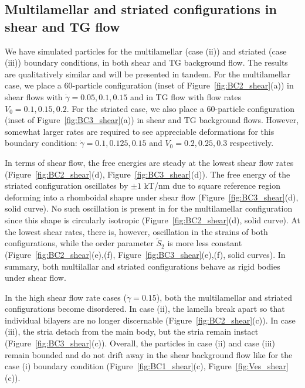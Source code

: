 \documentclass[aps,prl,preprint,groupedaddress]{revtex4-2}
\begin{document}
\subsection{Multilamellar and striated configurations in shear and TG flow}
We have simulated particles for the multilamellar (case (ii)) and striated (case (iii))
boundary conditions, in both shear and TG background flow.  The results are
qualitatively similar and will be presented in tandem. 
For the multilamellar case, we place a 60-particle configuration (inset of Figure~\ref{fig:BC2_shear}(a))
in shear flows with $\dot\gamma=0.05, 0.1, 0.15$ and in TG flow with flow rates $V_0=0.1, 0.15, 0.2$.
For the striated case, we also place a 60-particle configuration (inset of Figure~\ref{fig:BC3_shear}(a))
in shear and TG background flows.  However, somewhat larger rates are required to see appreciable
deformations for this boundary condition: $\dot\gamma=0.1, 0.125, 0.15$
and $V_0=0.2, 0.25, 0.3$ respectively.  

In terms of shear flow, the free energies are steady at the lowest shear flow
rates (Figure~\ref{fig:BC2_shear}(d), Figure~\ref{fig:BC3_shear}(d)).
The free energy of the striated configuration oscillates by $\pm 1$ kT/nm
due to square reference region deforming into a rhomboidal shapre under shear
flow (Figure~\ref{fig:BC3_shear}(d), solid curve).  No such oscillation
is present in for the multilamellar configuration since this shape is circularly
isotropic (Figure~\ref{fig:BC2_shear}(d), solid curve).
At the lowest shear rates, there is, however, oscillation in the strains
of both configurations, 
while the order parameter $\tilde S_2$ is more less constant
(Figure~\ref{fig:BC2_shear}(e),(f), Figure~\ref{fig:BC3_shear}(e),(f), solid curves).
In summary, both multilallar and striated configurations behave as rigid bodies
under shear flow.

In the high shear flow rate cases ($\dot\gamma=0.15$), both the
multilamellar and striated configurations become disordered.  In case (ii),
the lamella break apart so that individual bilayers are no longer discernable
(Figure~\ref{fig:BC2_shear}(c)).
In case (iii), the stria detach from the main body,
but the stria remain instact (Figure~\ref{fig:BC3_shear}(c)).  
Overall, the particles in case (ii) and case (iii) remain bounded
and do not drift away in the shear background flow like for the
case (i) boundary condition (Figure~\ref{fig:BC1_shear}(c),
Figure~\ref{fig:Ves_shear}(c)).
\end{document}
